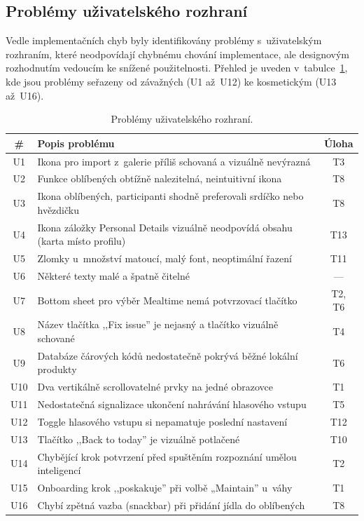 \subsection{Problémy uživatelského rozhraní}
\label{subsec:uiProblemyTesting}

Vedle implementačních chyb byly identifikovány problémy s~uživatelským rozhraním, které neodpovídají chybnému chování implementace, ale designovým rozhodnutím vedoucím ke snížené použitelnosti.
Přehled je uveden v~tabulce~\ref{tab:uiProblemy}, kde jsou problémy seřazeny od závažných (U1 až~U12) ke kosmetickým (U13 až~U16).

\begin{table}[ht]
	\centering
	\caption{Problémy uživatelského rozhraní.}
	\label{tab:uiProblemy}
	\small
	\begin{tabularx}{\textwidth}{@{}c X c@{}}
		\toprule
		\textbf{\#} & \textbf{Popis problému} & \textbf{Úloha} \\
		\midrule
		U1  & Ikona pro import z~galerie příliš schovaná a vizuálně nevýrazná & T3 \\
		U2  & Funkce oblíbených obtížně nalezitelná, neintuitivní ikona & T8 \\
		U3  & Ikona oblíbených, participanti shodně preferovali srdíčko nebo hvězdičku & T8 \\
		U4  & Ikona záložky Personal Details vizuálně neodpovídá obsahu (karta místo profilu) & T13 \\
		U5  & Zlomky u~množství matoucí, malý font, neoptimální řazení & T11 \\
		U6  & Některé texty malé a špatně čitelné & --- \\
		U7  & Bottom sheet pro výběr Mealtime nemá potvrzovací tlačítko & T2, T6 \\
		U8  & Název tlačítka ,,Fix issue'' je nejasný a tlačítko vizuálně schované & T4 \\
		U9  & Databáze čárových kódů nedostatečně pokrývá běžné lokální produkty & T6 \\
		U10 & Dva vertikálně scrollovatelné prvky na jedné obrazovce & T1 \\
		U11 & Nedostatečná signalizace ukončení nahrávání hlasového vstupu & T5 \\
		U12 & Toggle hlasového vstupu si nepamatuje poslední nastavení & T12 \\
		U13 & Tlačítko ,,Back to today'' je vizuálně potlačené & T10 \\
		U14 & Chybějící krok potvrzení před spuštěním rozpoznání umělou inteligencí & T2 \\
		U15 & Onboarding krok ,,poskakuje'' při volbě „Maintain'' u~váhy & T1 \\
		U16 & Chybí zpětná vazba (snackbar) při přidání jídla do oblíbených & T8 \\
		\bottomrule
	\end{tabularx}
\end{table}

